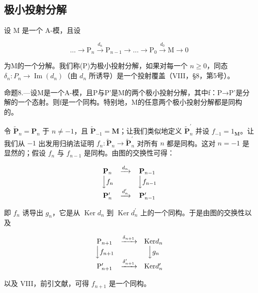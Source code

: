 \subsection{极小投射分解}

设 M 是一个 A-模，且设

\[
\dots \longrightarrow \mathrm{P} _ {n} \xrightarrow {d _ {n}} \mathrm{P} _ {n - 1} \longrightarrow \dots \longrightarrow \mathrm{P} _ {0} \xrightarrow {d _ {0}} \mathrm{M} \longrightarrow 0\tag{P}
\]

为M的一个分解。我们称(P)为极小投射分解，如果对每一个 \(n \geqslant 0\)，同态 \(\delta_{n}: P_{n} \to \operatorname{Im}(d_{n})\)（由 \(d_{n}\) 所诱导）是一个投射覆盖（VIII，§8，第5号）。

命题8.—设M是一个A-模，且P与P'是M的两个极小投射分解，其中f：P→P'是分解的一个态射。则f是一个同构。特别地，M的任意两个极小投射分解都是同构的。

令 \(\tilde{\mathbf{P}}_{n} = \mathbf{P}_{n}\) 于 \(n \neq -1\)，且 \(\tilde{\mathbf{P}}_{-1} = \mathbf{M}\)；让我们类似地定义 \(\tilde{\mathbf{P}}_{n}^{\prime}\) 并设 \(f_{-1} = 1_{\mathbf{M}}\)。让我们从 \(-1\) 出发用归纳法证明 \(f_{n}: \tilde{\mathbf{P}}_{n} \to \tilde{\mathbf{P}}_{n}^{\prime}\) 对所有 \(n\) 都是同构。这对 \(n = -1\) 是显然的；假设 \(f_{n}\) 与 \(f_{n-1}\) 是同构。由图的交换性可得：

\[
\begin{array}{c c c} \mathbf {P} _ {n} & \xrightarrow {d _ {n}} & \mathbf {P} _ {n - 1} \\ \Big \downarrow f _ {n} & & \Big \downarrow f _ {n - 1} \\ \mathbf {P} _ {n} ^ {\prime} & \xrightarrow {d _ {n} ^ {\prime}} & \mathbf {P} _ {n - 1} ^ {\prime} \end{array}
\]

即 \(f_{n}\) 诱导出 \(g_{n}\)，它是从 \(\operatorname{Ker} d_{n}\) 到 \(\operatorname{Ker} d_{n}^{\prime}\) 上的一个同构。于是由图的交换性以及

\[
\begin{array}{c c c} \mathrm{P} _ {n + 1} & \xrightarrow {\delta_ {n + 1}} & \text {Ker} d _ {n} \\ \Big \downarrow f _ {n + 1} & & \Big \downarrow g _ {n} \\ \mathrm{P} _ {n + 1} ^ {\prime} & \xrightarrow {\delta_ {n + 1} ^ {\prime}} & \text {Ker} d _ {n} ^ {\prime} \end{array}
\]

以及 VIII，前引文献，可得 \(f_{n+1}\) 是一个同构。

